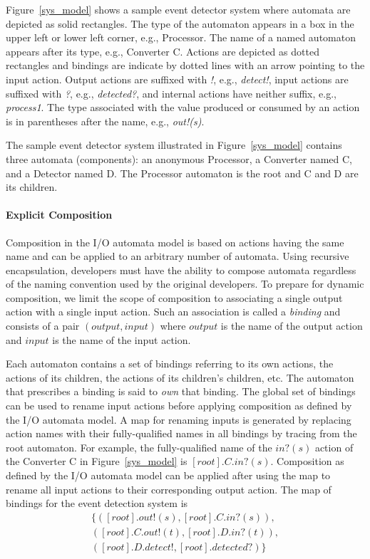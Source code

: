 Figure~\ref{sys_model} shows a sample event detector system where automata are depicted as solid rectangles.
The type of the automaton appears in a box in the upper left or lower left corner, e.g., Processor.
The name of a named automaton appears after its type, e.g., Converter C.
Actions are depicted as dotted rectangles and bindings are indicate by dotted lines with an arrow pointing to the input action.
Output actions are suffixed with \emph{!}, e.g., \emph{detect!}, input actions are suffixed with \emph{?}, e.g., \emph{detected?}, and internal actions have neither suffix, e.g., \emph{process1}.
The type associated with the value produced or consumed by an action is in parentheses after the name, e.g., \emph{out!(s)}.

The sample event detector system illustrated in Figure~\ref{sys_model} contains three automata (components):  an anonymous Processor, a Converter named C, and a Detector named D.
The Processor automaton is the root and C and D are its children.

\paragraph*{Explicit Composition}
Composition in the I/O automata model is based on actions having the same name and can be applied to an arbitrary number of automata.
Using recursive encapsulation, developers must have the ability to compose automata regardless of the naming convention used by the original developers.
To prepare for dynamic composition, we limit the scope of composition to associating a single output action with a single input action.
Such an association is called a \emph{binding} and consists of a pair $(output, input)$ where $output$ is the name of the output action and $input$ is the name of the input action.

Each automaton contains a set of bindings referring to its own actions, the actions of its children, the actions of its children's children, etc.
The automaton that prescribes a binding is said to \emph{own} that binding.
The global set of bindings can be used to rename input actions before applying composition as defined by the I/O automata model.
A map for renaming inputs is generated by replacing action names with their fully-qualified names in all bindings by tracing from the root automaton.
For example, the fully-qualified name of the $in?(s)$ action of the Converter C in Figure~\ref{sys_model} is $[root].C.in?(s)$.
Composition as defined by the I/O automata model can be applied after using the map to rename all input actions to their corresponding output action.
The map of bindings for the event detection system is 
\begin{displaymath}
\begin{split}
\{ ([root].out!(s), [root].C.in?(s)),\\
   ([root].C.out!(t), [root].D.in?(t)),\\
   ([root].D.detect!, [root].detected?) \}
\end{split}
\end{displaymath}

